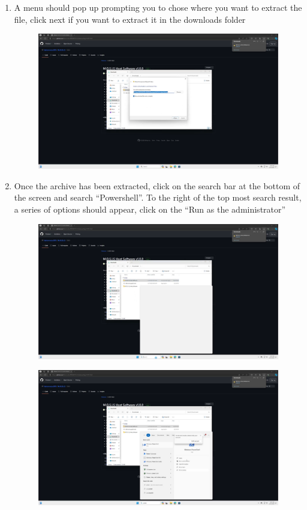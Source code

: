 \documentclass[12pt]{article}
\begin{document}
\begin{center}
\begin{enumerate}
\begin{figure}[H]
		      \end{figure}
		\item A menu should pop up prompting you to chose where you want to extract the file, click next if you want to extract it in the downloads folder
		      \begin{figure}[H]
			      \includegraphics[width=\textwidth]{Figures/Windows-Extract-Archive-Menu.png}
		      \end{figure}
		\item Once the archive has been extracted, click on the search bar at the bottom of the screen and search ``Powershell''. To the right of the top most search result, a series of options should appear, click on the ``Run as the administrator''
		      \begin{figure}[H]
			      \includegraphics[width=\textwidth]{Figures/Windows-Open-Search.png}
		      \end{figure}
		      \begin{figure}[H]
			      \includegraphics[width=\textwidth]{Figures/Windows-Open-Powershell-As-Admin.png}

\end{figure}
\end{enumerate}
\end{center}
\end{document}
